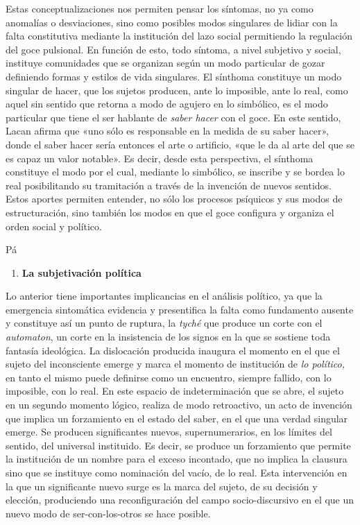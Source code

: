 Estas conceptualizaciones nos permiten pensar los síntomas, no ya como anomalías o desviaciones, sino como posibles modos singulares de lidiar con la falta constitutiva mediante la institución del lazo social permitiendo la regulación del goce pulsional. En función de esto, todo síntoma, a nivel subjetivo y social, instituye comunidades que se organizan según un modo particular de gozar definiendo formas y estilos de vida singulares. El sínthoma constituye un modo singular de hacer, que los sujetos producen, ante lo imposible, ante lo real, como aquel sin sentido que retorna a modo de agujero en lo simbólico, es el modo particular que tiene el ser hablante de \emph{saber hacer} con el goce. En este sentido, Lacan afirma que «uno sólo es responsable en la medida de su saber hacer», donde el saber hacer sería entonces el arte o artificio, «que le da al arte del que se es capaz un valor notable». Es decir, desde esta perspectiva, el sínthoma constituye el modo por el cual, mediante lo simbólico, se inscribe y se bordea lo real posibilitando su tramitación a través de la invención de nuevos sentidos. Estos aportes permiten entender, no sólo los procesos psíquicos y sus modos de estructuración, sino también los modos en que el goce configura y organiza el orden social y político.

Pá

\begin{enumerate}
\def\labelenumi{\arabic{enumi}.}
\item
  \textbf{La subjetivación política}
\end{enumerate}

Lo anterior tiene importantes implicancias en el análisis político, ya que la emergencia sintomática evidencia y presentifica la falta como fundamento ausente y constituye así un punto de ruptura, la \emph{tyché} que produce un corte con el \emph{automaton}, un corte en la insistencia de los signos en la que se sostiene toda fantasía ideológica. La dislocación producida inaugura el momento en el que el sujeto del inconsciente emerge y marca el momento de institución de \emph{lo político, }en tanto el mismo puede definirse como un encuentro, siempre fallido, con lo imposible, con lo real. En este espacio de indeterminación que se abre, el sujeto en un segundo momento lógico, realiza de modo retroactivo, un acto de invención que implica un forzamiento en el estado del saber, en el que una verdad singular emerge. Se producen significantes nuevos, supernumerarios, en los límites del sentido, del universal instituido. Es decir, se produce un forzamiento que permite la institución de un nombre para el exceso incontado, que no implica la clausura sino que se instituye como nominación del vacío, de lo real. Esta intervención en la que un significante nuevo surge es la marca del sujeto, de su decisión y elección, produciendo una reconfiguración del campo socio-discursivo en el que un nuevo modo de ser-con-los-otros se hace posible.


